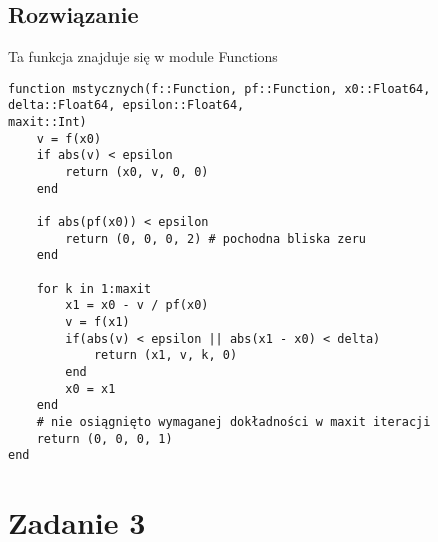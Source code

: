 \documentclass{article}
\begin{document}
\subsection{Rozwiązanie}
Ta funkcja znajduje się w module Functions
\begin{verbatim}
function mstycznych(f::Function, pf::Function, x0::Float64, delta::Float64, epsilon::Float64, 
maxit::Int)
    v = f(x0)
    if abs(v) < epsilon
        return (x0, v, 0, 0) 
    end

    if abs(pf(x0)) < epsilon
        return (0, 0, 0, 2) # pochodna bliska zeru
    end

    for k in 1:maxit
        x1 = x0 - v / pf(x0)
        v = f(x1)
        if(abs(v) < epsilon || abs(x1 - x0) < delta)
            return (x1, v, k, 0)
        end
        x0 = x1
    end
    # nie osiągnięto wymaganej dokładności w maxit iteracji
    return (0, 0, 0, 1)
end
\end{verbatim}

\section{Zadanie 3}
\end{document}
